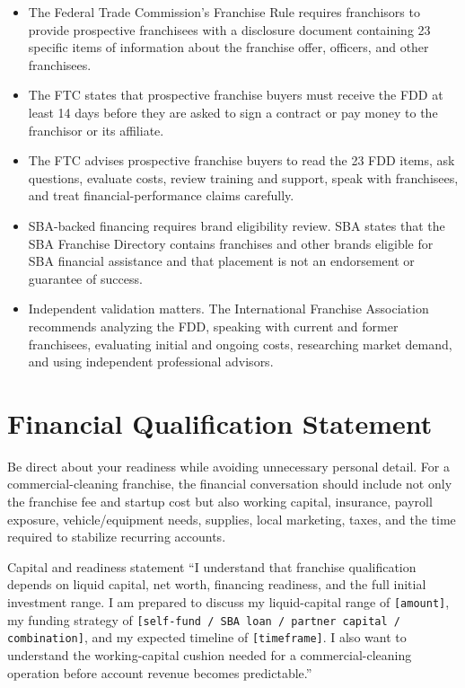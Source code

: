 \documentclass[11pt]{article}
\newcommand{\placeholder}[1]{\textcolor{accent}{\texttt{[#1]}}}
\begin{document}
\begin{itemize}
  \item The Federal Trade Commission's Franchise Rule requires franchisors to provide prospective franchisees with a disclosure document containing 23 specific items of information about the franchise offer, officers, and other franchisees.\cite{ftc-rule}
  \item The FTC states that prospective franchise buyers must receive the FDD at least 14 days before they are asked to sign a contract or pay money to the franchisor or its affiliate.\cite{ftc-consumer-guide,ftc-deep-dive}
  \item The FTC advises prospective franchise buyers to read the 23 FDD items, ask questions, evaluate costs, review training and support, speak with franchisees, and treat financial-performance claims carefully.\cite{ftc-consumer-guide,ftc-deep-dive}
  \item SBA-backed financing requires brand eligibility review. SBA states that the SBA Franchise Directory contains franchises and other brands eligible for SBA financial assistance and that placement is not an endorsement or guarantee of success.\cite{sba-directory}
  \item Independent validation matters. The International Franchise Association recommends analyzing the FDD, speaking with current and former franchisees, evaluating initial and ongoing costs, researching market demand, and using independent professional advisors.\cite{ifa-diligence}
\end{itemize}

\section{Financial Qualification Statement}

Be direct about your readiness while avoiding unnecessary personal detail. For a commercial-cleaning franchise, the financial conversation should include not only the franchise fee and startup cost but also working capital, insurance, payroll exposure, vehicle/equipment needs, supplies, local marketing, taxes, and the time required to stabilize recurring accounts.

\begin{scriptbox}{Capital and readiness statement}
``I understand that franchise qualification depends on liquid capital, net worth, financing readiness, and the full initial investment range. I am prepared to discuss my liquid-capital range of \placeholder{amount}, my funding strategy of \placeholder{self-fund / SBA loan / partner capital / combination}, and my expected timeline of \placeholder{timeframe}. I also want to understand the working-capital cushion needed for a commercial-cleaning operation before account revenue becomes predictable.''
\end{scriptbox}
\end{document}
